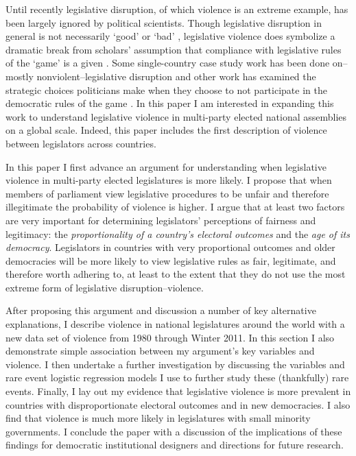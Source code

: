 \documentclass[a4paper]{article}\usepackage{graphicx, color}
\begin{document}
Until recently legislative disruption, of which violence is an extreme example, has been largely ignored by political scientists. Though legislative disruption in general is not necessarily `good' or `bad' \citep[see][for discussions of how disruption may be a `safety valve' in contexts where dissent is strongly curtailed]{Ostrow1996,Young2002}, legislative violence does symbolize a dramatic break from scholars' assumption that compliance with legislative rules of the `game' is a given \citep{Wolfe2004}. Some single-country case study work has been done on--mostly nonviolent--legislative disruption \cite[see][]{Armitage2013,Johnson2013,Ilie2013,Wolfe2004} and other work has examined the strategic choices politicians make when they choose to not participate in the democratic rules of the game \citep[e.g.][on election boycotts]{Beaulieu2008}. In this paper I am interested in expanding this work to understand legislative violence in multi-party elected national assemblies on a global scale. Indeed, this paper includes the first description of violence between legislators across countries. 

In this paper I first advance an argument for understanding when legislative violence in multi-party elected legislatures is more likely. I propose that when members of parliament view legislative procedures to be unfair and therefore illegitimate the probability of violence is higher. I argue that at least two factors are very important for determining legislators' perceptions of fairness and legitimacy: the \emph{proportionality of a country's electoral outcomes} and the \emph{age of its democracy}. Legislators in countries with very proportional outcomes and older democracies will be more likely to view legislative rules as fair, legitimate, and therefore worth adhering to, at least to the extent that they do not use the most extreme form of legislative disruption--violence. 

After proposing this argument and discussion a number of key alternative explanations, I describe violence in national legislatures around the world with a new data set of violence from 1980 through Winter 2011. In this section I also demonstrate simple association between my argument's key variables and violence. I then undertake a further investigation by discussing the variables and rare event logistic regression models \citep{KingRareEvents2001, KingRareEventsPA2001} I use to further study these (thankfully) rare events. Finally, I lay out my evidence that legislative violence is more prevalent in countries with disproportionate electoral outcomes and in new democracies. I also find that violence is much more likely in legislatures with small minority governments. I conclude the paper with a discussion of the implications of these findings for democratic institutional designers and directions for future research.
\end{document}

